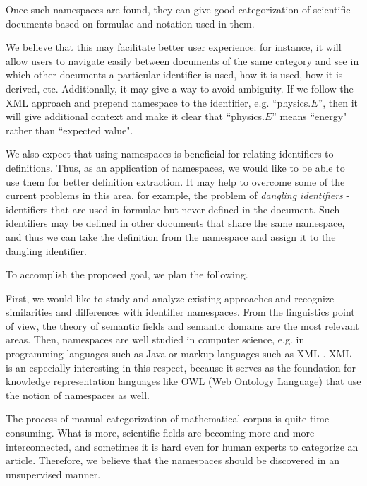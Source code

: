 Once such namespaces are found, they can give good categorization of scientific documents based on formulae and notation used in them.

We believe that this may facilitate better user experience: for instance, it will allow users to navigate easily between documents of the same category and see in which other documents a particular identifier is used, how it is used, how it is derived, etc. Additionally, it may give a way to avoid ambiguity. If we follow the XML approach \cite{xmlnamespaces} and prepend namespace to the identifier, e.g. ``physics.$E$'', then it will give additional context and make it clear that ``physics.$E$'' means ``energy" rather than ``expected value".

We also expect that using namespaces is beneficial for relating identifiers to definitions. Thus, as an application of namespaces, we would like to be able to use them for better definition extraction. It may help to overcome some of the current problems in this area, for example, the problem of \emph{dangling identifiers} \cite{pagael2014mlp} - identifiers that are used in formulae but never defined in the document. Such identifiers may be defined in other documents that share the same namespace, and thus we can take the definition from the namespace and assign it to the dangling identifier.


To accomplish the proposed goal, we plan the following.

First, we would like to study and analyze existing approaches and recognize similarities and differences with identifier namespaces. From the linguistics point of view, the theory of semantic fields \cite{vassilyev1974theory} and semantic domains \cite{gliozzo2009semantic} are the most relevant areas. Then, namespaces are well studied in computer science, e.g. in programming languages such as Java \cite{gosling2014java} or markup languages such as XML \cite{xmlnamespaces}. XML is an especially interesting in this respect, because it serves as the foundation for knowledge representation languages like OWL (Web Ontology Language) \cite{mcguinness2004owl} that use the notion of namespaces as well.

The process of manual categorization of mathematical corpus is quite time consuming. What is more, scientific fields are becoming more and more interconnected, and sometimes it is hard even for human experts to categorize an article. Therefore, we believe that the namespaces should be discovered in an unsupervised manner.


